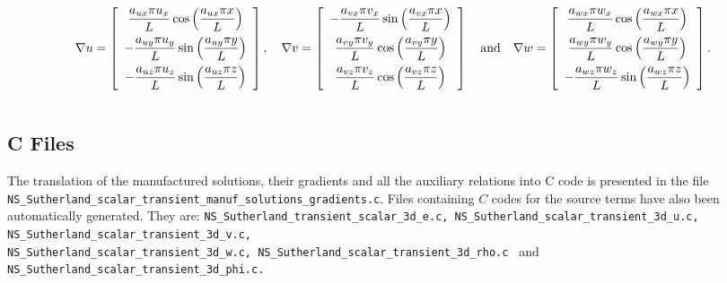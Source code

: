 \documentclass[10pt]{article}
\begin{document}
\begin{equation*}
\nabla u = \left[ \begin{array}{c}
  \dfrac{  a_{ux}  \pi u_x}{L} \cos\left( \dfrac{ a_{ux}  \pi  x}{L}\right)\vspace{5pt}\\
 -   \dfrac{  a_{uy}  \pi u_y}{L} \sin\left( \dfrac{ a_{uy}  \pi  y}{L}\right)\vspace{5pt}\\
 -   \dfrac{  a_{uz}  \pi u_z}{L} \sin\left( \dfrac{ a_{uz}  \pi  z}{L}\right)
\end{array} \right],
\quad
\nabla  v= \left[ \begin{array}{c}
-  \dfrac{  a_{vx}  \pi v_x}{L}  \sin\left( \dfrac{ a_{vx}  \pi  x}{L}\right)\vspace{5pt}\\
    \dfrac{  a_{vy}  \pi v_y}{L} \cos\left( \dfrac{ a_{vy}  \pi  y}{L}\right)\vspace{5pt}\\
   \dfrac{  a_{vz}  \pi v_z }{L} \cos\left( \dfrac{ a_{vz}  \pi  z}{L}\right)
\end{array} \right]
\quad\mbox{and}\quad
\nabla w = \left[ \begin{array}{c}
\dfrac{  a_{wx}  \pi  w_x}{L} \cos\left( \dfrac{ a_{wx}  \pi  x}{L}\right)\vspace{5pt}\\
  \dfrac{  a_{wy}  \pi w_y}{L}  \cos\left( \dfrac{ a_{wy}  \pi  y}{L}\right)\vspace{5pt} \\
 - \dfrac{  a_{wz}  \pi w_z}{L}  \sin\left( \dfrac{ a_{wz}  \pi  z}{L}\right)
\end{array} \right].
\end{equation*}

$$$$

\subsection{C Files}

The translation of the manufactured solutions, their gradients and all the auxiliary relations into C code is presented in the file \texttt{NS\_Sutherland\_scalar\_transient\_manuf\_solutions\_gradients.c}. Files containing $C$ codes for the source terms have also been automatically generated. They are: \texttt{NS\_Sutherland\_transient\_scalar\_3d\_e.c, NS\_Sutherland\_scalar\_transient\_3d\_u.c, NS\_Sutherland\_scalar\_transient\_3d\_v.c,\\ NS\_Sutherland\_scalar\_transient\_3d\_w.c, NS\_Sutherland\_scalar\_transient\_3d\_rho.c } and\\ \texttt{NS\_Sutherland\_scalar\_transient\_3d\_phi.c.}
\end{document}
